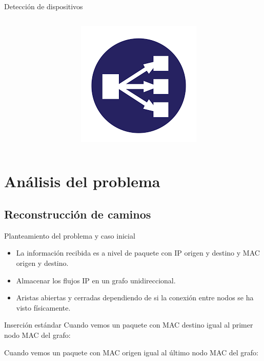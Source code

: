 \documentclass{beamer}
\begin{document}
\begin{frame}{Detección de dispositivos}
\begin{columns}
\begin{column}{0.3\textwidth}
    \end{column}
    \begin{column}{0.3\textwidth}
        \includegraphics[scale=0.3]{img/load_balancer.png}
    \end{column}
\end{columns}
    
\end{frame}

\section{Análisis del problema}
\subsection{Reconstrucción de caminos}
\begin{frame}{Planteamiento del problema y caso inicial}
\begin{itemize}
    \item La información recibida es a nivel de paquete con IP origen y destino y MAC origen y destino.
    \item Almacenar los flujos IP en un grafo unidireccional.
    \item Aristas abiertas y cerradas dependiendo de si la conexión entre nodos se ha visto físicamente.
\end{itemize}
\begin{figure}
    \scalebox{.7}{}
\end{figure}
\end{frame}

\begin{frame}{Inserción estándar}
Cuando vemos un paquete con MAC destino igual al primer nodo MAC del grafo:
\begin{figure}
    \scalebox{.7}{}
\end{figure}
\vskip 0.3cm
Cuando vemos un paquete con MAC origen igual al último nodo MAC del grafo:
\begin{figure}
    \scalebox{.7}{}
\end{figure}
\end{frame}
\end{document}
